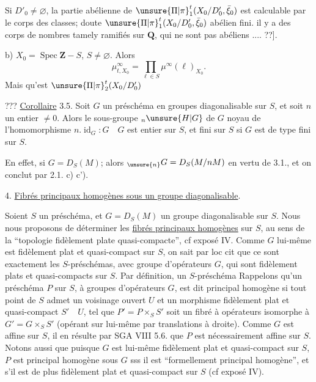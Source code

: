 Si $D'_0\ne\varnothing$, la partie abélienne de $\unsure{\Pi|\pi}_1^t(X_0/D'_0,\bar\xi_0)$ est calculable par le corps des classes;  doute $\unsure{\Pi|\pi}_1^t(X_0/D'_0,\bar\xi_0)$   abélien fini. il y a des  corps de nombres tamely ramifiés sur $\mathbf{Q}$, qui ne sont pas abéliens .... ??].

b) $X_0=\operatorname{Spec}\mathbf{Z}-S$, $S\ne\varnothing$. Alors
\[
\mu_{t,X_0}^\infty=\prod_{\ell\in S}\mu^\infty(\ell)_{X_0}.
\]
Mais qu'est $\unsure{\Pi|\pi}_2^t(X_0/D'_0)$

???
\uline{Corollaire} 3.5. Soit $G$ un  préschéma en groupes diagonalisable sur $S$, et soit $n$ un entier $\ne0$. Alors le sous-groupe ${}_n\unsure{H|G}$ de $G$ noyau de l'homomorphisme $n.\operatorname{id}_G:G\quad G$ est entier sur $S$, et fini sur $S$ si $G$ est de type fini sur $S$.

En effet, si $G=D_S(M)$; alors ${}_{\unsure{n}}G=D_S(M/nM)$ en vertu de 3.1., et on conclut par 2.1. c) c').

4. \uline{Fibrés principaux homogènes sous un groupe diagonalisable}.

Soient $S$ un préschéma, et $G=D_S(M)$ un groupe diagonalisable sur $S$. Nous nous proposons de déterminer les \uline{fibrés principaux homogènes} sur $S$, au sens de la ``topologie fidèlement plate quasi-compacte'', cf exposé IV. Comme $G$ lui-même est fidèlement plat et quasi-compact sur $S$, on sait par loc cit que ce sont exactement les $S$-préschémas,  avec groupe d'opérateurs $G$, qui sont fidèlement plats et quasi-compacts sur $S$. Par définition, un $S$-préschéma Rappelons qu'un préschéma $P$ sur $S$, à groupes d'opérateurs $G$, est dit principal homogène si tout point de $S$ admet un voisinage ouvert $U$ et un morphisme fidèlement plat et quasi-compact $S'\quad U$, tel que $P'=P\times_S S'$ soit un fibré à opérateurs isomorphe à $G'=G\times_S S'$ (opérant sur lui-même par translations à droite). Comme $G$ est affine sur $S$, il en résulte par SGA VIII 5.6. que $P$ est nécessairement affine sur $S$. Notons aussi que puisque $G$ est lui-même fidèlement plat et quasi-compact sur $S$, $P$ est principal homogène sous $G$ sss il est ``formellement principal homogène'', et s'il est de plus fidèlement plat et quasi-compact sur $S$ (cf exposé IV).

